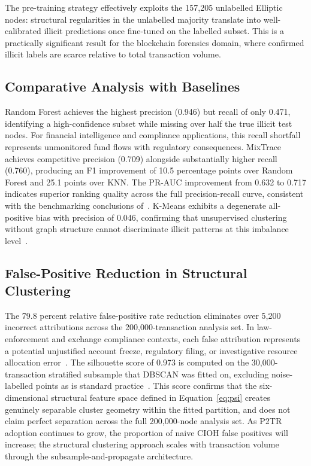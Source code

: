 \documentclass[12pt,a4paper]{article}
\begin{document}
The pre-training strategy effectively exploits the 157,205
unlabelled Elliptic nodes: structural regularities in the
unlabelled majority translate into well-calibrated illicit
predictions once fine-tuned on the labelled subset. This
is a practically significant result for the blockchain
forensics domain, where confirmed illicit labels are scarce
relative to total transaction volume.

\subsection{Comparative Analysis with Baselines}

Random Forest achieves the highest precision (0.946) but
recall of only 0.471, identifying a high-confidence subset
while missing over half the true illicit test nodes. For
financial intelligence and compliance applications, this
recall shortfall represents unmonitored fund flows with
regulatory consequences. MixTrace achieves competitive
precision (0.709) alongside substantially higher recall
(0.760), producing an F1 improvement of 10.5 percentage
points over Random Forest and 25.1 points over KNN. The
PR-AUC improvement from 0.632 to 0.717 indicates superior
ranking quality across the full precision-recall curve,
consistent with the benchmarking conclusions
of~\citet{fan2024gnn}. K-Means exhibits a degenerate
all-positive bias with precision of 0.046, confirming that
unsupervised clustering without graph structure cannot
discriminate illicit patterns at this imbalance
level~\citep{xiao2025}.

\subsection{False-Positive Reduction in Structural Clustering}

The 79.8 percent relative false-positive rate reduction
eliminates over 5,200 incorrect attributions across the
200,000-transaction analysis set. In law-enforcement and
exchange compliance contexts, each false attribution
represents a potential unjustified account freeze,
regulatory filing, or investigative resource allocation
error~\citep{lee2024}. The silhouette score of 0.973 is computed on the
30,000-transaction stratified subsample that DBSCAN was
fitted on, excluding noise-labelled points as is standard
practice~\citep{futureinternet2025}. This score confirms
that the six-dimensional structural feature space defined
in Equation~\eqref{eq:psi} creates genuinely separable
cluster geometry within the fitted partition, and does
not claim perfect separation across the full 200,000-node
analysis set.
As P2TR adoption continues to grow, the proportion of
naive CIOH false positives will increase; the structural
clustering approach scales with transaction volume through
the subsample-and-propagate architecture.
\end{document}
